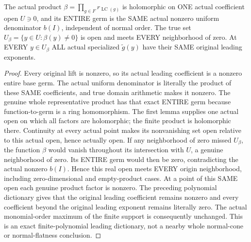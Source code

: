 \begin{theorem}
\label{hir:relative-normal-analytic-coefficients-same-denominator-open}
\leanok
{}
The actual product $\beta=\prod_{g\in F}r_{\operatorname{LC}(g)}$
is holomorphic on ONE actual coefficient open $U\ni0$, and its ENTIRE germ
is the SAME actual nonzero uniform denominator $b(I)$, independent of
normal order. The true set $U_\beta=\{y\in U:\beta(y)\ne0\}$ is open and
meets EVERY neighborhood of zero. At EVERY $y\in U_\beta$ ALL actual
specialized $\widetilde g(y)$ have their SAME original leading exponents.
\end{theorem}
\begin{proof}
Every original lift is nonzero, so its actual leading coefficient is a
nonzero entire base germ. The actual uniform denominator is literally
the product of these SAME coefficients, and true domain arithmetic makes
it nonzero. The genuine whole representative product has that exact
ENTIRE germ because function-to-germ is a ring homomorphism. The first
lemma supplies one actual open on which all factors are holomorphic;
the finite product is holomorphic there. Continuity at every actual
point makes its nonvanishing set open relative to this actual open,
hence actually open. If any neighborhood of zero missed $U_\beta$,
the function $\beta$ would vanish throughout its intersection with $U$,
a genuine neighborhood of zero. Its ENTIRE germ would then be zero,
contradicting the actual nonzero $b(I)$. Hence this real open meets EVERY
origin neighborhood, including zero-dimensional and empty-product cases.
At a point of this SAME open each genuine product factor is nonzero.
The preceding polynomial dictionary gives that the original leading
coefficient remains nonzero and every coefficient beyond the original
leading exponent remains literally zero. The actual monomial-order
maximum of the finite support is consequently unchanged. This is an
exact finite-polynomial leading dictionary, not a nearby whole normal-cone
or normal-flatness conclusion.
\end{proof}

